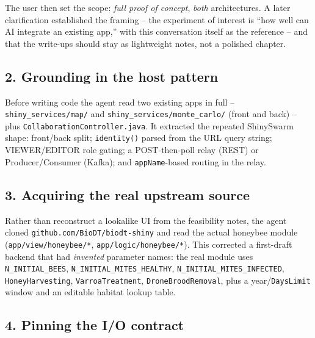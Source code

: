 The user then set the scope: \emph{full proof of concept}, \emph{both}
architectures. A later clarification established the framing -- the experiment of
interest is ``how well can AI integrate an existing app,'' with this conversation
itself as the reference -- and that the write-ups should stay as lightweight
notes, not a polished chapter.

\subsection*{2. Grounding in the host pattern}

Before writing code the agent read two existing apps in full --
\texttt{shiny\_services/map/} and \texttt{shiny\_services/monte\_carlo/} (front
and back) -- plus \texttt{CollaborationController.java}. It extracted the
repeated ShinySwarm shape: front/back split; \texttt{identity()} parsed from the
URL query string; VIEWER/EDITOR role gating; a POST-then-poll relay (REST) or
Producer/Consumer (Kafka); and \texttt{appName}-based routing in the relay.

\subsection*{3. Acquiring the real upstream source}

Rather than reconstruct a lookalike UI from the feasibility notes, the agent
cloned \texttt{github.com/BioDT/biodt-shiny} and read the actual honeybee module
(\texttt{app/view/honeybee/*}, \texttt{app/logic/honeybee/*}). This corrected a
first-draft backend that had \emph{invented} parameter names: the real module
uses \texttt{N\_INITIAL\_BEES}, \texttt{N\_INITIAL\_MITES\_HEALTHY},
\texttt{N\_INITIAL\_MITES\_INFECTED}, \texttt{HoneyHarvesting},
\texttt{VarroaTreatment}, \texttt{DroneBroodRemoval}, plus a
year/\texttt{DaysLimit} window and an editable habitat lookup table.

\subsection*{4. Pinning the I/O contract}

